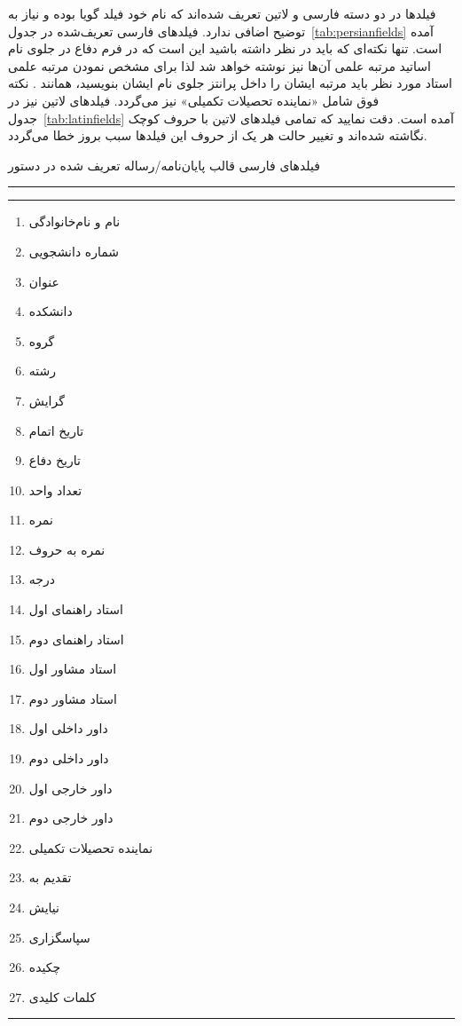     فیلدها در دو دسته فارسی و لاتین تعریف شده‌اند که نام خود فیلد گویا بوده و نیاز به توضیح اضافی ندارد. فیلدهای فارسی تعریف‌شده 
    در جدول~\ref{tab:persianfields} آمده است. تنها نکته‌ای که باید در نظر داشته باشید این است که در فرم دفاع در جلوی نام اساتید مرتبه 
    علمی آن‌ها نیز نوشته خواهد شد لذا برای مشخص نمودن مرتبه علمی استاد مورد نظر باید مرتبه ایشان را داخل پرانتز جلوی نام ایشان بنویسید، همانند 
    . 
    نکته فوق شامل «نماینده تحصیلات تکمیلی» نیز می‌گردد. فیلدهای لاتین نیز در جدول~\ref{tab:latinfields} آمده است. دقت نمایید که تمامی 
    فیلدهای لاتین با حروف کوچک نگاشته شده‌اند و تغییر حالت هر یک از حروف این فیلدها سبب بروز خطا می‌گردد. 
    
\begin{table}[htb]
\caption{فیلدهای فارسی قالب پایان‌نامه/رساله تعریف شده در دستور }
\label{tab:persianfields}
\smallskip
\hrule\hrule
\begin{multicols*}{3}
    \begin{enumerate}
        \item نام و نام‌خانوادگی
        \item شماره دانشجویی
        \item عنوان
        \item دانشکده
        \item گروه
        \item رشته
        \item گرایش
        \item تاریخ اتمام
        \item تاریخ دفاع
        \item تعداد واحد
        \item نمره
        \item نمره به حروف
        \item درجه
        \item استاد راهنمای اول
        \item استاد راهنمای دوم
        \item استاد مشاور اول 
        \item استاد مشاور دوم
        \item داور داخلی اول
        \item داور داخلی دوم
        \item داور خارجی اول
        \item داور خارجی دوم
        \item {\footnotesize  نماینده تحصیلات تکمیلی}
        \item تقدیم به
        \item نیایش
        \item سپاسگزاری
        \item چکیده
        \item کلمات کلیدی
    \end{enumerate}
\end{multicols*}
\hrule
\end{table}

